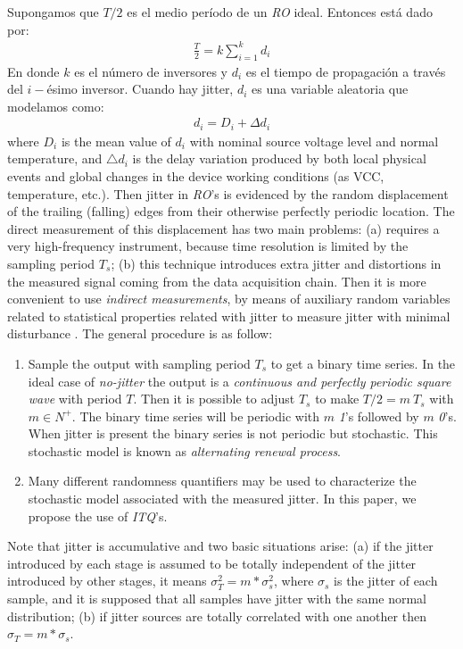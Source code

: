 Supongamos que $T/2$ es el medio período de un \emph{RO} ideal.
Entonces está dado por:
%
\begin{eqnarray}
\frac{T}{2}=k \sum_{i=1}^{k}d_i
\end{eqnarray}
%
En donde $k$ es el número de inversores y $d_i$ es el tiempo de propagación a través del $i-$ésimo inversor.
Cuando hay jitter, $d_i$ es una variable aleatoria que modelamos como:
%
\begin{eqnarray}
d_i=D_i+ \Delta d_i
\end{eqnarray}
%
where $D_i$ is the mean value of $d_i$ with nominal source voltage level and normal temperature, and $\bigtriangleup d_i$ is the delay variation produced by both local physical events and global changes in the device working conditions (as VCC, temperature, etc.). Then jitter in \emph{RO}'s is evidenced by the random displacement of the trailing (falling) edges from their otherwise perfectly periodic location. The direct measurement of this displacement has two main problems: (a) requires a very high-frequency instrument, because time resolution is limited by the sampling period $T_s$; (b) this technique introduces extra jitter and distortions in the measured signal coming from the data acquisition chain. Then it is more convenient to use \emph{indirect measurements}, by means of auxiliary random variables related to statistical properties related with jitter to measure jitter with minimal disturbance \cite{Lubicz2014}. The general procedure is as follow:
\begin{enumerate}
\label{list:altrenew}
\item Sample the output with sampling period $T_s$ to get a binary time series. 
In the ideal case of \emph{no-jitter} the output is a \emph{continuous and perfectly periodic square wave} with period $T$. Then it is possible to adjust $T_s$ to make $T/2=m~T_s$ with $m\in N^+$. The binary time series will be periodic with $m$ \emph{1}'s followed by $m$ \emph{0}'s. When jitter is present the binary series is not periodic but stochastic. This stochastic model is known as \emph{alternating renewal process}.
\item Many different randomness quantifiers may be used to characterize the stochastic model associated with the measured jitter. In this paper, we propose the use of \emph{ITQ}'s. 
\end{enumerate}
%
Note that jitter is accumulative and two basic situations arise: (a) if the jitter introduced by each stage is assumed to be totally independent of the jitter introduced by other stages, it means $\sigma_T^2=m*\sigma_s^2$, where $\sigma_s$ is the jitter of each sample, and it is supposed that all samples have jitter with the same normal distribution; (b) if jitter sources are totally correlated with one another then $\sigma_T=m*\sigma_s$. 